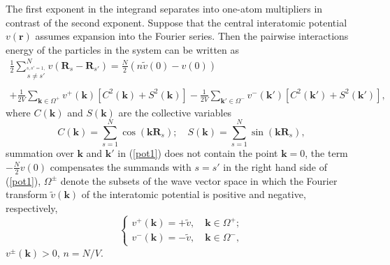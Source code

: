 \documentclass[aps,pre,preprint,floatfix,twoside,tightenlines,showpacs,
showkeys]{revtex4}
\begin{document}
The first exponent in the integrand separates into one-atom multipliers in contrast of the second exponent. Suppose that the central interatomic potential $v\left(\textbf{r}\right)$ assumes expansion into the Fourier series. Then the pairwise interactions energy of the particles in the system can be written as  
%
\begin{equation}
\label{pot1}
\begin{array}{r}
{\displaystyle 
\frac{1}{2} \sum\limits_{\stackrel{\scriptstyle s,s'=1,}{s\neq s'} }^N v(\textbf{R}_s - \textbf{R}_{s'}) = \frac{N}{2}\left(n\tilde{v} \left(0\right) - v\left(0\right)\right) }\\ \\
{\displaystyle  + \frac{1}{2V}\sum\limits_{\textbf{k}\in \Omega^+}v^{+}\left(\textbf{k}\right)\left[C^{2}\left(\textbf{k}\right) + S^{2}\left(\textbf{k}\right)\right]  
 - \frac{1}{2V}\sum\limits_{\textbf{k}{'}\in\Omega^{-}} v^{-}\left(\textbf{k}{'}\right)\left[C^{2}\left(\textbf{k}{'}\right) + S^{2}\left(\textbf{k}{'}\right)\right]},
\end{array}
\end{equation}
where $C\left(\mathbf{k}\right)$ and $S\left(\mathbf{k}\right)$ are the collective variables
%
\begin{equation}
\label{cos}
C\left(\mathbf{k}\right)= \sum\limits^{N}_{s=1}\cos\left(\mathbf{k}\textbf{R}_s\right){;} \quad S\left(\mathbf{k}\right)= \sum\limits^{N}_{s=1}\sin\left(\mathbf{k}\textbf{R}_s\right){,}
\end{equation}
%
summation over $\mathbf{k}$ and $\mathbf{k}'$ in (\ref{pot1}) does not contain the point $\mathbf{k}=0$, the term ${-}\frac{N}{2}v\left(0\right)$ compensates the summands with $s = s{'}$ in the right hand side of (\ref{pot1}), $\Omega^{\pm}$ denote the subsets of the wave vector space in which the Fourier transform $\tilde{v}\left(\textbf{k}\right)$ of the interatomic potential is positive and negative, respectively, 
\begin{equation}\label{v-pm}
\left\{
\begin{array}{l}
    {\displaystyle v^+\left(\mathbf{k}\right)=+\tilde{v},\quad \mathbf{k}\in\Omega^+ ;}\\
{\displaystyle v^-\left(\mathbf{k}\right)=-\tilde{v},\quad  \mathbf{k}\in\Omega^-, }
\end{array}
\right.
\end{equation}
$v^{\pm}(\mathbf{k})>0$, $n=N/V$.
\end{document}

